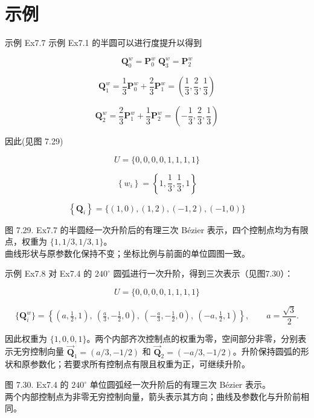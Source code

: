 \documentclass[../main.tex]{subfiles}
\begin{document}
\section*{示例}

示例 Ex7.7 示例 Ex7.1 的半圆可以进行度提升以得到

\[
{\mathbf{Q}}_{0}^{w} = {\mathbf{P}}_{0}^{w}\;{\mathbf{Q}}_{3}^{w} = {\mathbf{P}}_{2}^{w}
\]

\[
{\mathbf{Q}}_{1}^{w} = \frac{1}{3}{\mathbf{P}}_{0}^{w} + \frac{2}{3}{\mathbf{P}}_{1}^{w} = \left( {\frac{1}{3},\frac{2}{3},\frac{1}{3}}\right)
\]

\[
{\mathbf{Q}}_{2}^{w} = \frac{2}{3}{\mathbf{P}}_{1}^{w} + \frac{1}{3}{\mathbf{P}}_{2}^{w} = \left( {-\frac{1}{3},\frac{2}{3},\frac{1}{3}}\right)
\]

因此(见图 7.29)

\[
U = \{ 0,0,0,0,1,1,1,1\}
\]

\[
\left\{  {w}_{i}\right\}   = \left\{  {1,\frac{1}{3},\frac{1}{3},1}\right\}
\]

\[
\left\{  {\mathbf{Q}}_{i}\right\}   = \{ \left( {1,0}\right) ,\left( {1,2}\right) ,\left( {-1,2}\right) ,\left( {-1,0}\right) \}
\]

\begin{center}
\begin{minipage}{20cm}
\vspace*{.6\baselineskip}
\centering
{}
\par\smallskip
图 7.29. Ex7.7 的半圆经一次升阶后的有理三次 Bézier 表示，四个控制点均为有限点，权重为 $\{1,1/3,1/3,1\}$。\\
曲线形状与原参数化保持不变；坐标比例与前面的单位圆图一致。
\end{minipage}
\end{center}

示例 Ex7.8 对 Ex7.4 的 $240^\circ$ 圆弧进行一次升阶，得到三次表示（见图7.30）：

\[ U=\{0,0,0,0,1,1,1,1\} \]

\[ \{\mathbf Q_i^w\}=\left\{(a,\tfrac12,1),\ (\tfrac a3,-\tfrac12,0),\ (-\tfrac a3,-\tfrac12,0),\ (-a,\tfrac12,1)\right\},\qquad a=\frac{\sqrt3}{2}. \]

因此权重为 $\{1,0,0,1\}$。两个内部齐次控制点的权重为零，空间部分非零，分别表示无穷控制向量 $\overrightarrow{\mathbf Q}_1=(a/3,-1/2)$ 和 $\overrightarrow{\mathbf Q}_2=(-a/3,-1/2)$。升阶保持圆弧的形状和原参数化；若要求所有控制点有限且权重为正，可继续升阶。

\begin{center}
\begin{minipage}{26cm}
\vspace*{.6\baselineskip}
\centering
{}
\par\smallskip
图 7.30. Ex7.4 的 $240^\circ$ 单位圆弧经一次升阶后的有理三次 Bézier 表示。\\
两个内部控制点为非零无穷控制向量，箭头表示其方向；曲线及参数化与升阶前相同。
\end{minipage}
\end{center}
\end{document}
